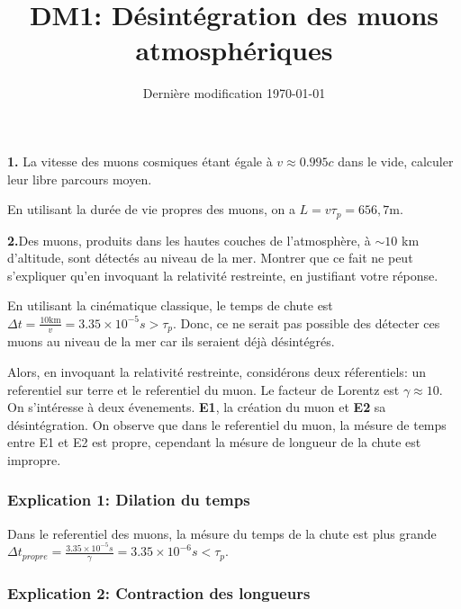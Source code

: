 \documentclass[french]{article}
\begin{document}
	\title{DM1: Désintégration des muons atmosphériques}
	\date{Dernière modification \today}
	
	\maketitle
	
	\begin{tcolorbox}[colback=gray!5!white,colframe=gray!75!black]
		\textbf{1.} La vitesse des muons cosmiques étant égale à $v \approx 0.995c$ dans le vide, calculer leur libre parcours moyen. 
	\end{tcolorbox}

	En utilisant la durée de vie propres des muons, on a $L = v \tau_p = 656,7 \mathrm{m}$.

	\begin{tcolorbox}[colback=gray!5!white,colframe=gray!75!black]
		\textbf{2.}Des muons, produits dans les hautes couches de l'atmosphère, à $\sim 10$ km d'altitude, sont détectés au niveau de la mer. Montrer que ce fait ne peut s'expliquer qu'en invoquant la relativité restreinte, en justifiant votre réponse.
	\end{tcolorbox}

	En utilisant la cinématique classique, le temps de chute est $\Delta t = \frac{10 \mathrm{km}}{v} = 3.35 \times 10^{-5}s > \tau_p$. Donc, ce ne serait pas possible des détecter ces muons au niveau de la mer car ils seraient déjà désintégrés.

	Alors, en invoquant la relativité restreinte, considérons deux réferentiels: un referentiel sur terre et le referentiel du muon. Le facteur de Lorentz est $\gamma \approx 10$. On s'intéresse à deux évenements. \textbf{E1}, la création du muon et \textbf{E2} sa désintégration. On observe que dans le referentiel du muon, la mésure de temps entre E1 et E2 est propre, cependant la mésure de longueur de la chute est impropre.

	\subsubsection*{Explication 1: Dilation du temps}
	
	Dans le referentiel des muons, la mésure du temps de la chute est plus grande $\Delta t_{propre} = \frac{3.35 \times 10^{-5}s}{\gamma} = 3.35 \times 10^{-6}s < \tau_p$.
	
	\subsubsection*{Explication 2: Contraction des longueurs}
	
\end{document}
